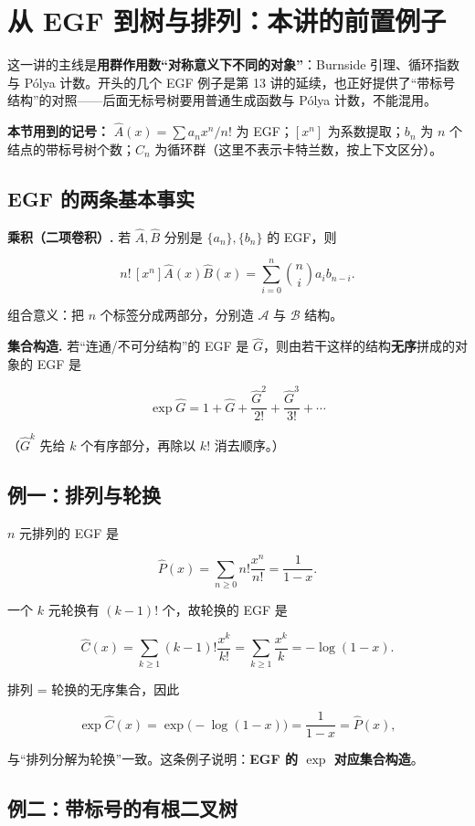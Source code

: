 \section{从 EGF 到树与排列：本讲的前置例子}


这一讲的主线是\textbf{用群作用数“对称意义下不同的对象”}：Burnside 引理、循环指数与 Pólya 计数。开头的几个 EGF 例子是第 13 讲的延续，也正好提供了“带标号结构”的对照——后面无标号树要用普通生成函数与 Pólya 计数，不能混用。

\textbf{本节用到的记号：} $\hat A(x)=\sum a_nx^n/n!$ 为 EGF；$[x^n]$ 为系数提取；$b_n$ 为 $n$ 个结点的带标号树个数；$C_n$ 为循环群（这里不表示卡特兰数，按上下文区分）。

\subsection{EGF 的两条基本事实}


\textbf{乘积（二项卷积）.} 若 $\hat A,\hat B$ 分别是 $\{a_n\},\{b_n\}$ 的 EGF，则

\[
n!\,[x^n]\hat A(x)\hat B(x)=\sum_{i=0}^{n}\binom ni a_i b_{n-i}.
\]

组合意义：把 $n$ 个标签分成两部分，分别造 $\mathcal A$ 与 $\mathcal B$ 结构。

\textbf{集合构造.} 若“连通/不可分结构”的 EGF 是 $\hat G$，则由若干这样的结构\textbf{无序}拼成的对象的 EGF 是

\[
\exp\hat G=1+\hat G+\frac{\hat G^2}{2!}+\frac{\hat G^3}{3!}+\cdots
\]

（$\hat G^k$ 先给 $k$ 个有序部分，再除以 $k!$ 消去顺序。）

\subsection{例一：排列与轮换}


$n$ 元排列的 EGF 是

\[
\hat P(x)=\sum_{n\ge0}n!\frac{x^n}{n!}=\frac{1}{1-x}.
\]

一个 $k$ 元轮换有 $(k-1)!$ 个，故轮换的 EGF 是

\[
\hat C(x)=\sum_{k\ge1}(k-1)!\frac{x^k}{k!}
=\sum_{k\ge1}\frac{x^k}{k}=-\log(1-x).
\]

排列 = 轮换的无序集合，因此

\[
\exp\hat C(x)=\exp\bigl(-\log(1-x)\bigr)=\frac{1}{1-x}=\hat P(x),
\]

与“排列分解为轮换”一致。这条例子说明：\textbf{EGF 的 $\exp$ 对应集合构造}。

\subsection{例二：带标号的有根二叉树}


